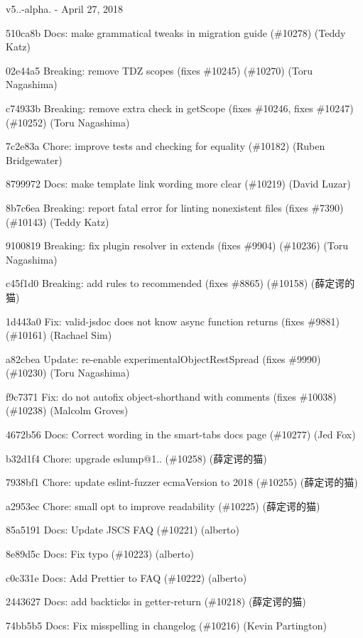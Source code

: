 v5..-\/alpha. -\/ April 27, 2018


\begin{DoxyItemize}
\item 510ca8b Docs\+: make grammatical tweaks in migration guide (\#10278) (Teddy Katz)
\item 02e44a5 Breaking\+: remove TDZ scopes (fixes \#10245) (\#10270) (Toru Nagashima)
\item c74933b Breaking\+: remove extra check in get\+Scope (fixes \#10246, fixes \#10247) (\#10252) (Toru Nagashima)
\item 7c2e83a Chore\+: improve tests and checking for equality (\#10182) (Ruben Bridgewater)
\item 8799972 Docs\+: make template link wording more clear (\#10219) (David Luzar)
\item 8b7c6ea Breaking\+: report fatal error for linting nonexistent files (fixes \#7390) (\#10143) (Teddy Katz)
\item 9100819 Breaking\+: fix plugin resolver in extends (fixes \#9904) (\#10236) (Toru Nagashima)
\item c45f1d0 Breaking\+: add rules to recommended (fixes \#8865) (\#10158) (薛定谔的猫)
\item 1d443a0 Fix\+: valid-\/jsdoc does not know async function returns (fixes \#9881) (\#10161) (Rachael Sim)
\item a82cbea Update\+: re-\/enable experimental\+Object\+Rest\+Spread (fixes \#9990) (\#10230) (Toru Nagashima)
\item f9c7371 Fix\+: do not autofix object-\/shorthand with comments (fixes \#10038) (\#10238) (Malcolm Groves)
\item 4672b56 Docs\+: Correct wording in the {\ttfamily smart-\/tabs} docs page (\#10277) (Jed Fox)
\item b32d1f4 Chore\+: upgrade eslump@1.. (\#10258) (薛定谔的猫)
\item 7938bf1 Chore\+: update eslint-\/fuzzer ecma\+Version to 2018 (\#10255) (薛定谔的猫)
\item a2953ec Chore\+: small opt to improve readability (\#10225) (薛定谔的猫)
\item 85a5191 Docs\+: Update JSCS FAQ (\#10221) (alberto)
\item 8e89d5c Docs\+: Fix typo (\#10223) (alberto)
\item c0c331e Docs\+: Add Prettier to FAQ (\#10222) (alberto)
\item 2443627 Docs\+: add backticks in getter-\/return (\#10218) (薛定谔的猫)
\item 74bb5b5 Docs\+: Fix misspelling in changelog (\#10216) (Kevin Partington)
\end{DoxyItemize}

